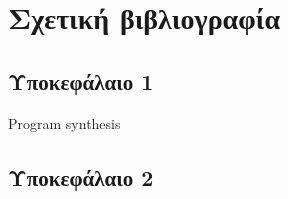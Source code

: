 \chapter{Σχετική βιβλιογραφία}

\section{Υποκεφάλαιο 1}
Program synthesis

\section{Υποκεφάλαιο 2}

